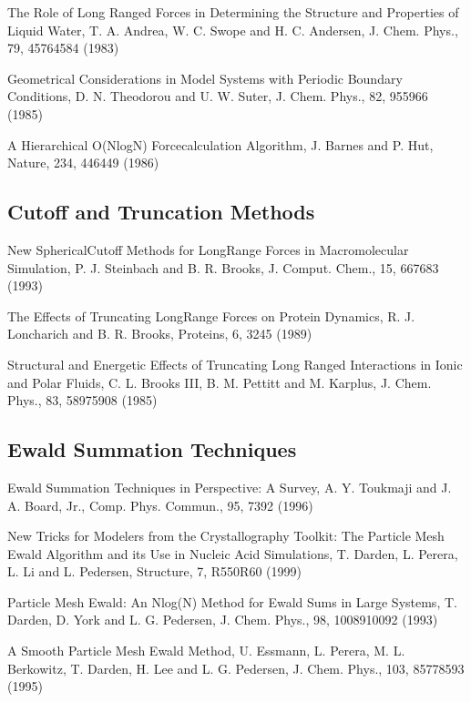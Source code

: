 \documentclass[letterpaper,11pt,english]{sphinxmanual}
\begin{document}
The Role of Long Ranged Forces in Determining the Structure and Properties of Liquid Water, T. A. Andrea, W. C. Swope and H. C. Andersen, J. Chem. Phys., 79, 4576\sphinxhyphen{}4584 (1983)

Geometrical Considerations in Model Systems with Periodic Boundary Conditions, D. N. Theodorou and U. W. Suter, J. Chem. Phys., 82, 955\sphinxhyphen{}966 (1985)

A Hierarchical O(NlogN) Force\sphinxhyphen{}calculation Algorithm, J. Barnes and P. Hut, Nature, 234, 446\sphinxhyphen{}449 (1986)


\subsection{Cutoff and Truncation Methods}
\label{\detokenize{text/references:cutoff-and-truncation-methods}}
New Spherical\sphinxhyphen{}Cutoff Methods for Long\sphinxhyphen{}Range Forces in Macromolecular Simulation, P. J. Steinbach and B. R. Brooks, J. Comput. Chem., 15, 667\sphinxhyphen{}683 (1993)

The Effects of Truncating Long\sphinxhyphen{}Range Forces on Protein Dynamics, R. J. Loncharich and B. R. Brooks, Proteins, 6, 32\sphinxhyphen{}45 (1989)

Structural and Energetic Effects of Truncating Long Ranged Interactions in Ionic and Polar Fluids, C. L. Brooks III, B. M. Pettitt and M. Karplus, J. Chem. Phys., 83, 5897\sphinxhyphen{}5908 (1985)


\subsection{Ewald Summation Techniques}
\label{\detokenize{text/references:ewald-summation-techniques}}
Ewald Summation Techniques in Perspective: A Survey, A. Y. Toukmaji and J. A. Board, Jr., Comp. Phys. Commun., 95, 73\sphinxhyphen{}92 (1996)

New Tricks for Modelers from the Crystallography Toolkit: The Particle Mesh Ewald Algorithm and its Use in Nucleic Acid Simulations, T. Darden, L. Perera, L. Li and L. Pedersen, Structure, 7, R550\sphinxhyphen{}R60 (1999)

Particle Mesh Ewald: An Nlog(N) Method for Ewald Sums in Large Systems, T. Darden, D. York and L. G. Pedersen, J. Chem. Phys., 98, 10089\sphinxhyphen{}10092 (1993)

A Smooth Particle Mesh Ewald Method, U. Essmann, L. Perera, M. L. Berkowitz, T. Darden, H. Lee and L. G. Pedersen, J. Chem. Phys., 103, 8577\sphinxhyphen{}8593 (1995)
\end{document}
